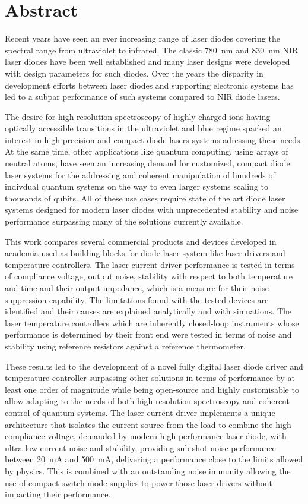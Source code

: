 \section*{Abstract}
Recent years have seen an ever increasing range of laser diodes covering the spectral range from ultraviolet to infrared. The classic \qty{780}{\nm} and \qty{830}{\nm} NIR laser diodes have been well established and many laser designs were developed with design parameters for such diodes. Over the years the disparity in development efforts between laser diodes and supporting electronic systems has led to a subpar performance of such systems compared to NIR diode lasers.

The desire for high resolution spectroscopy of highly charged ions having optically accessible transitions in the ultraviolet and blue regime sparked an interest in high precision and compact diode lasers systems adressing these needs. At the same time, other applications like quantum computing, using arrays of neutral atoms, have seen an increasing demand for customized, compact diode laser systems for the addressing and coherent manipulation of hundreds of indivdual quantum systems on the way to even larger systems scaling to thousands of qubits. All of these use cases require state of the art diode laser systems designed for modern laser diodes with unprecedented stability and noise performance surpassing many of the solutions currently available.

This work compares several commercial products and devices developed in academia used as building blocks for diode laser system like laser drivers and temperature controllers. The laser current driver performance is tested in terms of compliance voltage, output noise, stability with respect to both temperature and time and their output impedance, which is a measure for their noise suppression capability. The limitations found with the tested devices are identified and their causes are explained analytically and with simuations. The laser temperature controllers which are inherently closed-loop instruments whose performance is determined by their front end were tested in terms of noise and stability using reference resistors against a reference thermometer.

These results led to the development of a novel fully digital laser diode driver and temperature controller surpassing other solutions in terms of performance by at least one order of magnitude while being open-source and highly customisable to allow adapting to the needs of both high-resolution spectroscopy and coherent control of quantum systems. The laser current driver implements a unique architecture that isolates the current source from the load to combine the high compliance voltage, demanded by modern high performance laser diode, with ultra-low current noise and stability, providing sub-shot noise performance between \qty{20}{\mA} and \qty{500}{\mA}, delivering a performance close to the limits allowed by physics. This is combined with an outstanding noise immunity allowing the use of compact switch-mode supplies to power those laser drivers without impacting their performance.

